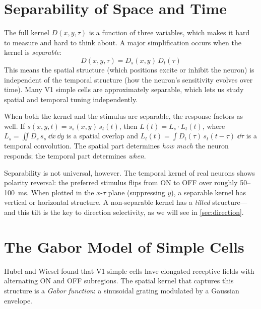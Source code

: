 \section{Separability of Space and Time}
\label{sec:separability}

The full kernel $D(x, y, \tau)$ is a function of three variables, which makes it hard to measure and hard to think about. A major simplification occurs when the kernel is \emph{separable}:
%
\begin{equation}
  D(x, y, \tau) = D_s(x, y)\,D_t(\tau)
  \label{eq:separable-rf}
\end{equation}
%
This means the spatial structure (which positions excite or inhibit the neuron) is independent of the temporal structure (how the neuron's sensitivity evolves over time). Many V1 simple cells are approximately separable, which lets us study spatial and temporal tuning independently.

When both the kernel and the stimulus are separable, the response factors as well. If $s(x, y, t) = s_s(x, y)\,s_t(t)$, then $L(t) = L_s \cdot L_t(t)$, where $L_s = \iint D_s\, s_s\;\dd x\,\dd y$ is a spatial overlap and $L_t(t) = \int D_t(\tau)\,s_t(t - \tau)\;\dd\tau$ is a temporal convolution. The spatial part determines \emph{how much} the neuron responds; the temporal part determines \emph{when}.

Separability is not universal, however. The temporal kernel of real neurons shows polarity reversal: the preferred stimulus flips from ON to OFF over roughly 50--100~ms. When plotted in the $x$-$\tau$ plane (suppressing $y$), a separable kernel has vertical or horizontal structure. A non-separable kernel has a \emph{tilted} structure---and this tilt is the key to direction selectivity, as we will see in \cref{sec:direction}.

\section{The Gabor Model of Simple Cells}
\label{sec:gabor}

Hubel and Wiesel found that V1 simple cells have elongated receptive fields with alternating ON and OFF subregions. The spatial kernel that captures this structure is a \emph{Gabor function}: a sinusoidal grating modulated by a Gaussian envelope.


